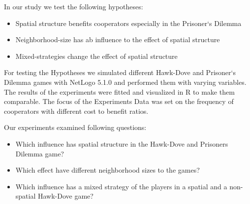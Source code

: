 In our study we test the following hypotheses: 

\begin{itemize}
\item Spatial structure benefits cooperators especially in the Prisoner`s Dilemma 
\item Neighborhood-size has ab influence to the effect of spatial structure
\item Mixed-strategies change the effect of spatial structure
\end{itemize}

For testing the Hypotheses we simulated different Hawk-Dove and Prisoner`s Dilemma games with NetLogo 5.1.0 and performed them with varying variables. The results of the experiments were fitted and visualized in R to make them comparable. The focus of the Experiments Data was set on the frequency of cooperators with different cost to benefit ratios.

Our experiments examined following questions:
\begin{itemize}
\item Which influence has spatial structure in the Hawk-Dove and Prisoners Dilemma game?
\item Which effect have different neighborhood sizes to the games?
\item Which influence has a mixed strategy of the players in a spatial and a non-spatial Hawk-Dove game?
\end{itemize}
